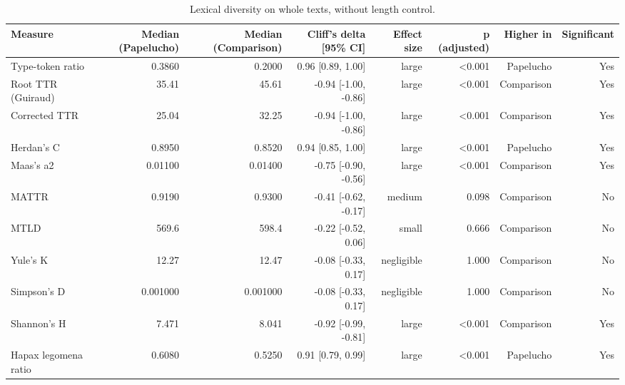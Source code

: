 \begin{table}[htbp]
\centering
\small
\caption{Lexical diversity on whole texts, without length control.}
\label{tab:lexical-wholetext}
\begin{tabular}{lrrrrrrr}
\toprule
\textbf{Measure} & \textbf{Median (Papelucho)} & \textbf{Median (Comparison)} & \textbf{Cliff's delta [95\% CI]} & \textbf{Effect size} & \textbf{p (adjusted)} & \textbf{Higher in} & \textbf{Significant} \\
\midrule
Type-token ratio & 0.3860 & 0.2000 & 0.96 [0.89, 1.00] & large & <0.001 & Papelucho & Yes \\
Root TTR (Guiraud) & 35.41 & 45.61 & -0.94 [-1.00, -0.86] & large & <0.001 & Comparison & Yes \\
Corrected TTR & 25.04 & 32.25 & -0.94 [-1.00, -0.86] & large & <0.001 & Comparison & Yes \\
Herdan's C & 0.8950 & 0.8520 & 0.94 [0.85, 1.00] & large & <0.001 & Papelucho & Yes \\
Maas's a2 & 0.01100 & 0.01400 & -0.75 [-0.90, -0.56] & large & <0.001 & Comparison & Yes \\
MATTR & 0.9190 & 0.9300 & -0.41 [-0.62, -0.17] & medium & 0.098 & Comparison & No \\
MTLD & 569.6 & 598.4 & -0.22 [-0.52, 0.06] & small & 0.666 & Comparison & No \\
Yule's K & 12.27 & 12.47 & -0.08 [-0.33, 0.17] & negligible & 1.000 & Comparison & No \\
Simpson's D & 0.001000 & 0.001000 & -0.08 [-0.33, 0.17] & negligible & 1.000 & Comparison & No \\
Shannon's H & 7.471 & 8.041 & -0.92 [-0.99, -0.81] & large & <0.001 & Comparison & Yes \\
Hapax legomena ratio & 0.6080 & 0.5250 & 0.91 [0.79, 0.99] & large & <0.001 & Papelucho & Yes \\
\bottomrule
\end{tabular}
\end{table}

